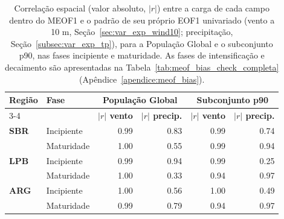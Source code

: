 \begin{table}[htbp]
\centering
\caption[Correlação espacial entre o MEOF1 e os EOF1 univariados (Global e p90)]{Correlação espacial (valor absoluto, $|r|$) entre a carga de cada campo dentro do MEOF1 e o padrão de seu próprio EOF1 univariado (vento a 10 m, Seção~\ref{sec:var_exp_wind10}; precipitação, Seção~\ref{subsec:var_exp_tp}), para a População Global e o subconjunto p90, nas fases incipiente e maturidade. As fases de intensificação e decaimento são apresentadas na Tabela~\ref{tab:meof_bias_check_completa} (Apêndice~\ref{apendice:meof_bias}).}
\label{tab:meof_bias_check}
\begin{tabular*}{\textwidth}{@{\extracolsep{\fill}}llrrrr}
\hline
\textbf{Região} & \textbf{Fase} & \multicolumn{2}{c}{\textbf{População Global}} & \multicolumn{2}{c}{\textbf{Subconjunto p90}} \\
\cline{3-4} \cline{5-6}
 & & \textbf{$|r|$ vento} & \textbf{$|r|$ precip.} & \textbf{$|r|$ vento} & \textbf{$|r|$ precip.} \\
\hline
\textbf{SBR} & Incipiente & 0.99 & 0.83 & 0.99 & 0.74 \\
 & Maturidade & 1.00 & 0.55 & 0.99 & 0.94 \\
\hline
\textbf{LPB} & Incipiente & 0.99 & 0.94 & 0.99 & 0.25 \\
 & Maturidade & 1.00 & 0.33 & 0.94 & 0.97 \\
\hline
\textbf{ARG} & Incipiente & 1.00 & 0.56 & 1.00 & 0.49 \\
 & Maturidade & 0.99 & 0.79 & 0.94 & 0.97 \\
\hline
\end{tabular*}
\end{table}
